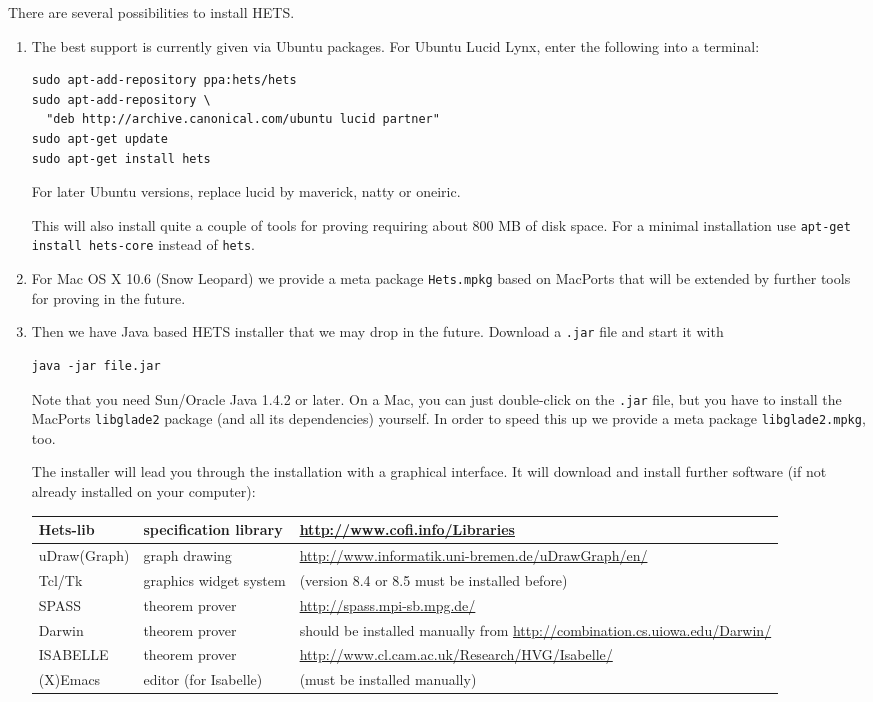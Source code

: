 \documentclass{article}
\newcommand{\normalTEXTSC}[2]{{#1\scriptsize#2}}
\newcommand     {\Hets}{\normalTEXTSC{H}{ETS}\xspace}
\newcommand     {\Isabelle}{\normalTEXTSC{I}{SABELLE}\xspace}
\newcommand     {\SPASS}{\normalTEXTSC{S}{PASS}\xspace}
\begin{document}
There are several possibilities to install \Hets.
\begin{enumerate}
\item
The best support is currently given via Ubuntu packages.
For Ubuntu Lucid Lynx, enter the following into a terminal:
\begin{lstlisting}
sudo apt-add-repository ppa:hets/hets
sudo apt-add-repository \
  "deb http://archive.canonical.com/ubuntu lucid partner"
sudo apt-get update
sudo apt-get install hets
\end{lstlisting}
For later Ubuntu versions, replace lucid by maverick, natty or oneiric.

This will also install quite a couple of tools for proving requiring about
800 MB of disk space. For a minimal installation use \texttt{apt-get install
  hets-core} instead of \texttt{hets}.
\item For Mac OS X 10.6 (Snow Leopard) we provide a meta package
  \texttt{Hets.mpkg} based on MacPorts that will be extended by further tools
  for proving in the future.
\item
Then we have Java based \Hets installer that we may drop in the future.
Download a \texttt{.jar} file and start it with
\begin{lstlisting}
java -jar file.jar
\end{lstlisting}
Note that you need Sun/Oracle Java 1.4.2 or later. On a Mac, you can just
double-click on the \texttt{.jar} file, but you have to install the MacPorts
\texttt{libglade2} package (and all its dependencies) yourself. In order to
speed this up we provide a meta package \texttt{libglade2.mpkg}, too.

The installer will lead you through the installation with
a graphical interface. It will download and install further
software (if not already installed on your computer):

\medskip
{\small
\begin{tabularx}{\linewidth}{|l|l|X|}\hline
Hets-lib & specification library & \url{http://www.cofi.info/Libraries}\\\hline
uDraw(Graph) & graph drawing & \url{http://www.informatik.uni-bremen.de/uDrawGraph/en/}\\\hline
Tcl/Tk & graphics widget system & (version 8.4 or 8.5 must be installed before)\\\hline
\SPASS & theorem prover & \url{http://spass.mpi-sb.mpg.de/}\\\hline
Darwin & theorem prover & should be installed manually from \url{http://combination.cs.uiowa.edu/Darwin/}\\\hline
\Isabelle & theorem prover & \url{http://www.cl.cam.ac.uk/Research/HVG/Isabelle/}\\\hline
(X)Emacs & editor (for Isabelle) & (must be installed manually)\\\hline
\end{tabularx}
}
\medskip


\end{enumerate}
\end{document}
